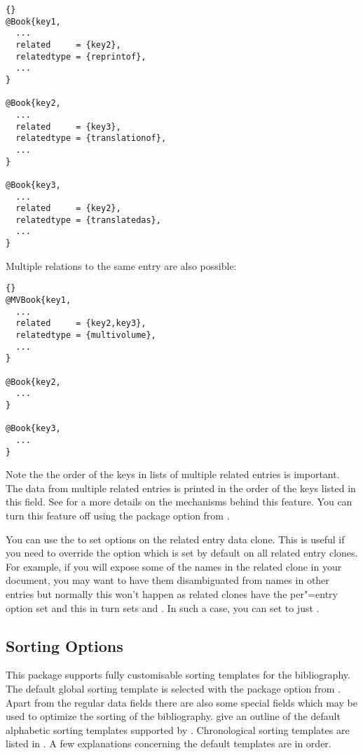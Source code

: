 \documentclass{ltxdockit}[2011/03/25]
\newcommand*{\biblatex}{\sty{biblatex}\xspace}
\begin{document}
\begin{lstlisting}[style=bibtex]{}
@Book{key1,
  ...
  related     = {key2},
  relatedtype = {reprintof},
  ...
}

@Book{key2,
  ...
  related     = {key3},
  relatedtype = {translationof},
  ...
}

@Book{key3,
  ...
  related     = {key2},
  relatedtype = {translatedas},
  ...
}
\end{lstlisting}
%
Multiple relations to the same entry are also possible:
\begin{lstlisting}[style=bibtex]{}
@MVBook{key1,
  ...
  related     = {key2,key3},
  relatedtype = {multivolume},
  ...
}

@Book{key2,
  ...
}

@Book{key3,
  ...
}
\end{lstlisting}
%
Note the the order of the keys in lists of multiple related entries is important. The data from multiple related entries is printed in the order of the keys listed in this field. See  for a more details on the mechanisms behind this feature. You can turn this feature off using the package option  from .

You can use the  to set options on the related entry data clone. This is useful if you need to override the  option which is set by default on all related entry clones. For example, if you will expose some of the names in the related clone in your document, you may want to have them disambiguated from names in other entries but normally this won't happen as related clones have the per"=entry  option set and this in turn sets  and . In such a case, you can set  to just .

\subsection{Sorting Options}
\label{use:srt}

This package supports fully customisable sorting templates for the bibliography. The default global sorting template is selected with the  package option from . Apart from the regular data fields there are also some special fields which may be used to optimize the sorting of the bibliography.  give an outline of the default alphabetic sorting templates supported by \biblatex. Chronological sorting templates are listed in . A few explanations concerning the default templates are in order.
\end{document}
